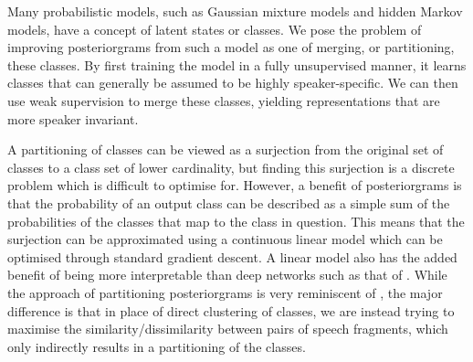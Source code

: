 Many probabilistic models, such as Gaussian mixture models and hidden Markov models, have a concept of latent states or classes.
We pose the problem of improving posteriorgrams from such a model as one of merging, or partitioning, these classes.
By first training the model in a fully unsupervised manner, it learns classes that can generally be assumed to be highly speaker-specific.
We can then use weak supervision to merge these classes, yielding representations that are more speaker invariant.

A partitioning of classes can be viewed as a surjection from the original set of classes to a class set of lower cardinality, but finding this surjection is a discrete problem which is difficult to optimise for.
However, a benefit of posteriorgrams is that the probability of an output class can be described as a simple sum of the probabilities of the classes that map to the class in question.
This means that the surjection can be approximated using a continuous linear model which can be optimised through standard gradient descent.
A linear model also has the added benefit of being more interpretable than deep networks such as that of \textcite{thiolliere2015hybrid}.
While the approach of partitioning posteriorgrams is very reminiscent of \textcite{jansen2013weak}, the major difference is that in place of direct clustering of classes, we are instead trying to maximise the similarity/dissimilarity between pairs of speech fragments, which only indirectly results in a partitioning of the classes.


